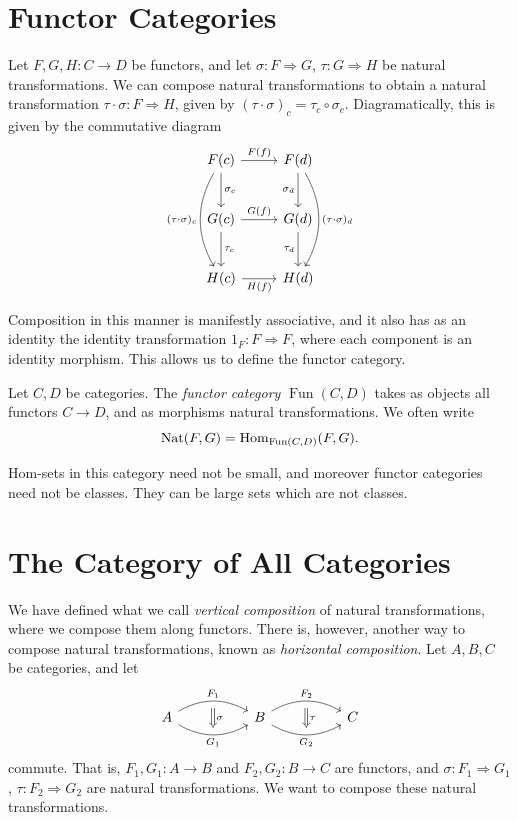 \section{Functor Categories}

Let $F,G,H : C \to D$ be functors, and let $\sigma : F \Rightarrow G$, $\tau : G \Rightarrow H$ be natural transformations. We can compose natural transformations to obtain a natural transformation $\tau \cdot \sigma : F \Rightarrow H $, given by $(\tau \cdot \sigma )_c=\tau _c\circ \sigma _c$. Diagramatically, this is given by the commutative diagram
\[\begin{tikzcd}[row sep = 2.5em, column sep = 2.5em]
F(c)\ar[" F(f) ", r]\ar[" \sigma_c ", d] \ar[" (\tau \cdot \sigma )_c "', bend right, dd]   & F(d)\ar[" \sigma _d "', d] \ar[" (\tau \cdot \sigma )_d ", bend left, dd]  \\
G(c)\ar[" G(f) ", r] \ar[" \tau _c ", d]  & G(d)\ar[" \tau _d "', d]  \\
H(c)\ar[" H(f) "', r]  & H(d)
\end{tikzcd}\]

Composition in this manner is manifestly associative, and it also has as an identity the identity transformation $1_F : F \Rightarrow F$, where each component is an identity morphism. This allows us to define the functor category.

\begin{definition}\label{dfn:2.3}
	Let $C,D$ be categories. The \emph{functor category} $\operatorname{Fun} (C,D)$ takes as objects all functors $C\to D$, and as morphisms natural transformations. We often write
	\[
		\operatorname{Nat} (F,G)=\operatorname{Hom}_{\operatorname{Fun} (C,D)}(F, G) 
	.\]
\end{definition}
 
Hom-sets in this category need not be small, and moreover functor categories need not be classes. They can be large sets which are not classes.

\section{The Category of All Categories}

We have defined what we call \emph{vertical composition} of natural transformations, where we compose them along functors. There is, however, another way to compose natural transformations, known as \emph{horizontal composition}. Let $A,B,C$ be categories, and let
\[\begin{tikzcd}[row sep = 5em, column sep = 5em]
	A\ar[" F_1 "{name=F1}, bend left, r] \ar[" G_1 "'{name=G1}, bend right, r]  & B \ar[" F_2 "{name=F2}, bend left, r] \ar[" G_2 "'{name=G2}, bend right, r]  & C
	\arrow[from=F1, to=G1, Rightarrow, " \sigma  ", shorten=5pt]
	\arrow[from=F2, to=G2, Rightarrow, " \tau  ", shorten=5pt]
\end{tikzcd}\]
commute. That is, $F_1,G_1: A \to B$ and $F_2,G_2: B \to C$ are functors, and $\sigma : F_1 \Rightarrow G_1$, $\tau : F_2 \Rightarrow G_2$ are natural transformations. We want to compose these natural transformations.

